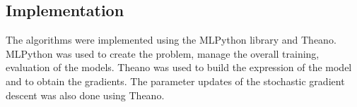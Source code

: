 \documentclass{article} %
\begin{document}
\subsection{Implementation}

The algorithms were implemented using the MLPython library\cite{mlpython} and Theano\cite{Bastien-Theano-2012}. MLPython was used to create the problem, manage the overall training, evaluation of the models. Theano was used to build the expression of the model and to obtain the gradients. The parameter updates of the stochastic gradient descent was also done using Theano.






\end{document}
